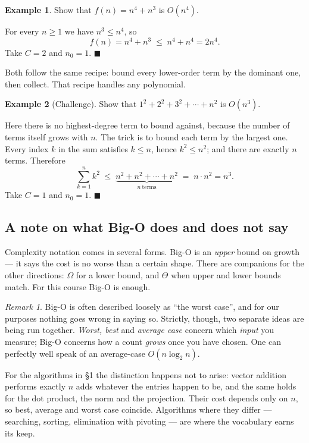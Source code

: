 \documentclass[11pt]{article}
\theoremstyle{plain}
\theoremstyle{definition}
\newtheorem{ex}{Example}[section]
\theoremstyle{remark}
\newtheorem*{rmk}{Remark}
\begin{document}
\begin{ex}
Show that $f(n)=n^{4}+n^{3}$ is $O(n^{4})$.

For every $n\ge1$ we have $n^{3}\le n^{4}$, so
\[
  f(n) = n^{4}+n^{3} \;\le\; n^{4}+n^{4} = 2n^{4} .
\]
Take $C=2$ and $n_0=1$. \hfill$\blacksquare$
\end{ex}

\noindent Both follow the same recipe: bound every lower-order term by the
dominant one, then collect. That recipe handles any polynomial.

\begin{ex}[Challenge]
Show that $1^{2}+2^{2}+3^{2}+\cdots+n^{2}$ is $O(n^{3})$.

Here there is no highest-degree term to bound against, because the number of
terms itself grows with $n$. The trick is to bound each term by the largest one.
Every index $k$ in the sum satisfies $k\le n$, hence $k^{2}\le n^{2}$; and there
are exactly $n$ terms. Therefore
\[
  \sum_{k=1}^{n}k^{2}
  \;\le\; \underbrace{n^{2}+n^{2}+\cdots+n^{2}}_{n\ \text{terms}}
  \;=\; n\cdot n^{2} = n^{3} .
\]
Take $C=1$ and $n_0=1$. \hfill$\blacksquare$
\end{ex}

\subsection{A note on what Big-O does and does not say}
Complexity notation comes in several forms. Big-O is an \emph{upper} bound on
growth --- it says the cost is no worse than a certain shape. There are
companions for the other directions: $\Omega$ for a lower bound, and $\Theta$
when upper and lower bounds match. For this course Big-O is enough.

\begin{rmk}
Big-O is often described loosely as ``the worst case'', and for our purposes
nothing goes wrong in saying so. Strictly, though, two separate ideas are being
run together. \emph{Worst, best} and \emph{average case} concern which
\emph{input} you measure; Big-O concerns how a count \emph{grows} once you have
chosen. One can perfectly well speak of an average-case $O(n\log_2 n)$.

For the algorithms in \S1 the distinction happens not to arise: vector addition
performs exactly $n$ adds whatever the entries happen to be, and the same holds
for the dot product, the norm and the projection. Their cost depends only on
$n$, so best, average and worst case coincide. Algorithms where they differ ---
searching, sorting, elimination with pivoting --- are where the vocabulary earns
its keep.
\end{rmk}
\end{document}
